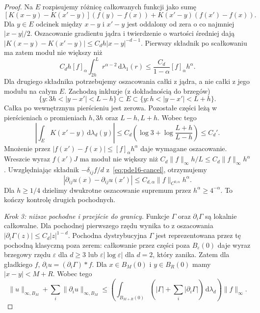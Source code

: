 \begin{proof}
Na $E$ rozpisujemy różnicę całkowanych funkcji
jako sumę
\[
 [K(x-y)-K(x'-y)](f(y)-f(x))
       +K(x'-y)(f(x')-f(x)).
\]
Dla $y\in E$ odcinek między $x-y$ i $x'-y$
jest oddalony od zera o co najmniej $|x-y|/2$.
Oszacowanie gradientu jądra i twierdzenie
o wartości średniej dają
$|K(x-y)-K(x'-y)|\le C_d h|x-y|^{-d-1}$.
Pierwszy składnik po scałkowaniu ma zatem moduł
nie większy niż
\[
 C_d h[f]_\alpha\int_{2h}^{L}r^{\alpha-2}\,
          \mathrm d\lambda_1(r)
 \le \frac{C_d}{1-\alpha}[f]_\alpha h^\alpha .
\]
Dla drugiego składnika potrzebujemy oszacowania
całki z jądra, a nie całki z jego modułu na całym $E$.
Zachodzą inkluzje (z dokładnością do brzegów)
\[
 \{y:3h<|y-x'|<L-h\}\subset E
 \subset\{y:h<|y-x'|<L+h\}.
\]
Całka po wewnętrznym pierścieniu jest zerowa.
Pozostałe części leżą w pierścieniach o promieniach
$h,3h$ oraz $L-h,L+h$. Wobec tego
\[
 \left|\int_E K(x'-y)\,\mathrm d\lambda_d(y)\right|
 \le C_d\left(\log3+\log\frac{L+h}{L-h}\right)\le C_d'.
\]
Mnożenie przez $|f(x')-f(x)|\le[f]_\alpha h^\alpha$
daje wymagane oszacowanie. Wreszcie wyraz
$f(x')J$ ma moduł nie większy niż
$C_d\|f\|_\infty h/L\le C_d\|f\|_\infty h^\alpha$.
Uwzględniając składnik $-\delta_{ij}f/d$
z~\eqref{eq:pde16-cancel}, otrzymujemy
\[
 |\partial_{ij}u(x)-\partial_{ij}u(x')|
 \le C_{d,\alpha}\|f\|_{C^{0,\alpha}} h^\alpha .
\]
Dla $h\ge1/4$ dzielimy dwukrotne oszacowanie
supremum przez $h^\alpha\ge4^{-\alpha}$.
To kończy kontrolę drugich pochodnych.

\emph{Krok 3: niższe pochodne i przejście do granicy.}
Funkcje $\Gamma$ oraz $\partial_i\Gamma$ są lokalnie
całkowalne. Dla pochodnej pierwszego rzędu wynika
to z oszacowania $|\partial_i\Gamma(z)|\le C_d|z|^{1-d}$.
Pochodna dystrybucyjna $\Gamma$ jest reprezentowana
przez tę pochodną klasyczną poza zerem: całkowanie
przez części poza $B_\varepsilon(0)$ daje wyraz brzegowy
rzędu $\varepsilon$ dla $d\ge3$ lub
$\varepsilon|\log\varepsilon|$ dla $d=2$, który zanika.
Zatem dla gładkiego $f$,
$\partial_i u=(\partial_i\Gamma)*f$.
Dla $x\in B_M(0)$ i $y\in B_R(0)$ mamy
$|x-y|<M+R$. Wobec tego
\[
 \|u\|_{\infty,B_M}+\sum_i\|\partial_i u\|_{\infty,B_M}
 \le\left(\int_{B_{M+R}(0)}
 (|\Gamma|+\sum_i|\partial_i\Gamma|)\,\mathrm d\lambda_d\right)
 \|f\|_\infty .
\]


\end{proof}
